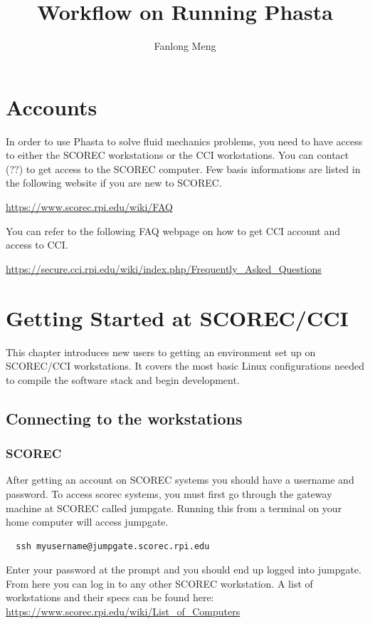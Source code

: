 \documentclass{article}
\title{Workflow on Running Phasta}
\author{Fanlong Meng}
\begin{document}
\lstset{style=myc}

\maketitle

\section{Accounts}

In order to use Phasta to solve fluid mechanics problems, you need to have access to either the SCOREC workstations or the CCI workstations.
You can contact (??) to get access to the SCOREC computer. Few basis informations are listed in the following website if you are new to SCOREC.


\url{https://www.scorec.rpi.edu/wiki/FAQ}


You can refer to the following FAQ webpage on how to get CCI account and access to CCI.


\url{https://secure.cci.rpi.edu/wiki/index.php/Frequently_Asked_Questions}

\section{Getting Started at SCOREC/CCI}

This chapter introduces new users to getting an environment set up on SCOREC/CCI workstations. It covers the most basic Linux configurations needed to compile the software stack and begin development.

\subsection{Connecting to the workstations}
\subsubsection{SCOREC}
After getting an account on SCOREC systems you should have a username and password. To access scorec systems, you must first go through the gateway machine at SCOREC called jumpgate. Running this from a terminal on your home computer will access jumpgate.
\begin{lstlisting}
  ssh myusername@jumpgate.scorec.rpi.edu
\end{lstlisting}
Enter your password at the prompt and you should end up logged into jumpgate. From here you can log in to any other SCOREC workstation. A list of workstations and their specs can be found here:\\
\url{https://www.scorec.rpi.edu/wiki/List_of_Computers}
\end{document}
